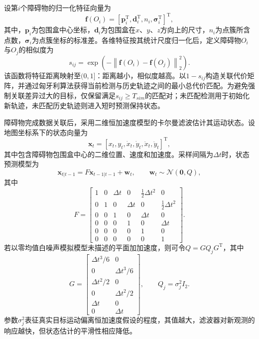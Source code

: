 设第$i$个障碍物的归一化特征向量为
\begin{equation}
    \mathbf{f}(O_i)
    =\left[\mathbf{p}_i^{\mathrm{T}},\mathbf{d}_i^{\mathrm{T}},n_i,
    \boldsymbol{\sigma}_i^{\mathrm{T}}\right]^{\mathrm{T}},
    \label{eq:obstacle_feature}
\end{equation}
其中，$\mathbf{p}_i$为包围盒中心坐标，$\mathbf{d}_i$为包围盒在$x$、$y$、$z$方向上的尺寸，$n_i$为点簇所含点数，$\boldsymbol{\sigma}_i$为点簇坐标的标准差。各维特征按其统计尺度归一化后，定义障碍物$O_i$与$O_j$的相似度为
\begin{equation}
    s_{ij}
    =\exp\!\left(-\left\|\mathbf{f}(O_i)-\mathbf{f}(O_j)\right\|_2^2\right).
    \label{eq:obstacle_similarity}
\end{equation}
该函数将特征距离映射至$(0,1]$：距离越小，相似度越高。以$1-s_{ij}$构造关联代价矩阵，并通过匈牙利算法获得当前检测与历史轨迹之间的最小总代价匹配。为避免强制关联差异过大的目标，仅保留满足$s_{ij}\geq T_{sim}$的匹配对；未匹配检测用于初始化新轨迹，未匹配历史轨迹则进入短时预测保持状态。

障碍物完成数据关联后，采用二维恒加速度模型的卡尔曼滤波估计其运动状态。设地图坐标系下的状态向量为
\begin{equation}
    \mathbf{x}_t=[x_t,y_t,\dot{x}_t,\dot{y}_t,\ddot{x}_t,\ddot{y}_t]^{\mathrm{T}},
    \label{eq:ca_state}
\end{equation}
其中包含障碍物包围盒中心的二维位置、速度和加速度。采样间隔为$\Delta t$时，状态预测模型为
\begin{equation}
    \mathbf{x}_{t|t-1}=F\mathbf{x}_{t-1|t-1}+\mathbf{w}_t,
    \qquad \mathbf{w}_t\sim\mathcal{N}(\mathbf{0},Q),
    \label{eq:ca_prediction}
\end{equation}
其中
\begin{equation}
    F=\begin{bmatrix}
        1&0&\Delta t&0&\frac{1}{2}\Delta t^2&0\\
        0&1&0&\Delta t&0&\frac{1}{2}\Delta t^2\\
        0&0&1&0&\Delta t&0\\
        0&0&0&1&0&\Delta t\\
        0&0&0&0&1&0\\
        0&0&0&0&0&1
    \end{bmatrix}.
    \label{eq:ca_transition}
\end{equation}
若以零均值白噪声模拟模型未描述的平面加加速度，则可令$Q=GQ_jG^{\mathrm{T}}$，其中
\begin{equation}
    G=\begin{bmatrix}
        \Delta t^3/6&0\\0&\Delta t^3/6\\
        \Delta t^2/2&0\\0&\Delta t^2/2\\
        \Delta t&0\\0&\Delta t
    \end{bmatrix},\qquad Q_j=\sigma_j^2 I_2.
    \label{eq:ca_process_noise}
\end{equation}
参数$\sigma_j^2$表征真实目标运动偏离恒加速度假设的程度，其值越大，滤波器对新观测的响应越快，但状态估计的平滑性相应降低。

